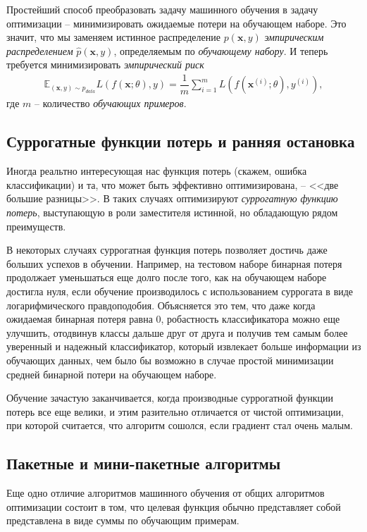 \documentclass[%
	11pt,
	a4paper,
	utf8,
]{article}
\begin{document}
Простейший способ преобразовать задачу машинного обучения в задачу оптимизации -- минимизировать ожидаемые потери на обучающем наборе. Это значит, что мы заменяем истинное распределение $ p(\mathbf{x}, y) $ \emph{эмпирическим распределением} $ \hat{p}(\mathbf{x}, y) $, определяемым по \emph{обучающему набору}. И теперь требуется минимизировать \emph{эмпирический риск}
\begin{align*}
	\mathbb{E}_{ (\mathbf{x}, y) \sim \hat{p}_{data} } L(f(\mathbf{x}; \theta), y) = \dfrac{1}{m} \sum_{i=1}^m L(f(\mathbf{x}^{(i)}; \theta), y^{(i)}),
\end{align*}
где $ m $ -- количество \emph{обучающих примеров}.

\subsection{Суррогатные функции потерь и ранняя остановка}

Иногда реальтно интересующая нас функция потерь (скажем, ошибка классификации) и та, что может быть эффективно оптимизирована, -- <<две большие разницы>>. В таких случаях оптимизируют \emph{суррогатную функцию потерь}, выступающую в роли заместителя истинной, но обладающую рядом преимуществ. 

В некоторых случаях суррогатная функция потерь позволяет достичь даже больших успехов в обучении. Например, на тестовом наборе бинарная потеря продолжает уменьшаться еще долго после того, как на обучающем наборе достигла нуля, если обучение производилось с использованием суррогата в виде логарифмического правдоподобия. Объясняется это тем, что даже когда ожидаемая бинарная потеря равна 0, робастность классификатора можно еще улучшить, отодвинув классы дальше друг от друга и получив тем самым более уверенный и надежный классификатор, который извлекает больше информации из обучающих данных, чем было бы возможно в случае простой минимизации средней бинарной потери на обучающем наборе.

Обучение зачастую заканчивается, когда производные суррогатной функции потерь все еще велики, и этим разительно отличается от чистой оптимизации, при которой считается, что алгоритм сошолся, если градиент стал очень малым.

\subsection{Пакетные и мини-пакетные алгоритмы}

Еще одно отличие алгоритмов машинного обучения от общих алгоритмов оптимизации состоит в том, что целевая функция обычно представляет собой представлена в виде суммы по обучающим примерам. 
\end{document}
